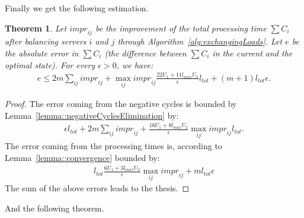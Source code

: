 \documentclass[11pt]{article}
\newcommand{\ltot}{{{l_{\mathit{tot}}}}}
\newcommand{\impr}{{{\mathit{impr}}}}
\newcommand{\lmax}{{{l_{\mathit{max}}}}}
\newtheorem{theorem}{Theorem}
\begin{document}
Finally we get the following estimation.

\begin{theorem}\label{thm::finalEstimation}
Let $\mathit{impr}_{ij}$ be the improvement of the total processing time $\sum C_{i}$ after balancing servers $i$ and $j$ through Algorithm~\ref{alg:exchangingLoads}. Let $e$ be the absolute error in $\sum C_{i}$ (the difference between $\sum C_{i}$ in the current and the optimal state). For every $\epsilon > 0$, we have:
\begin{align*}
e \leq 2m \sum_{ij} \impr_{ij} + \max_{ij} \impr_{ij} \frac{22U_1 + 11\lmax U_2}{\epsilon} \ltot + (m+1)\ltot\epsilon \textrm{.}
\end{align*}
\end{theorem}
\begin{proof}
The error coming from the negative cycles is bounded by Lemma~\ref{lemma::negativeCyclesElimination} by:
\begin{align}
\epsilon \ltot + 2m \sum_{ij} \impr_{ij} + \frac{16U_1 + 8\lmax U_2}{\epsilon} \max_{ij} \impr_{ij} \ltot \textrm{.}
\end{align}
The error coming from the processing times is, according to Lemma~\ref{lemma::convergence} bounded by:
\begin{align*}
\ltot \frac{6U_1 + 3\lmax U_2}{\epsilon} \max_{ij} \mathit{impr}_{ij} + m\ltot\epsilon
\end{align*}
The sum of the above errors leads to the thesis.
\end{proof}

And the following theorem.
\end{document}
